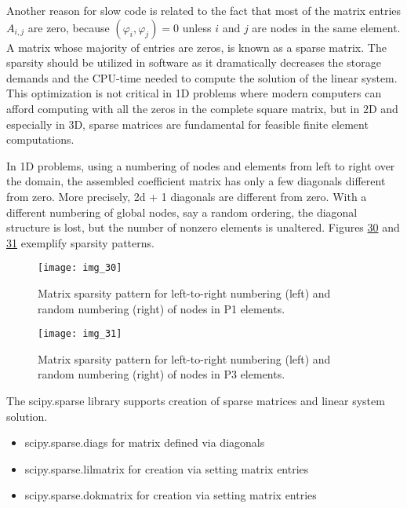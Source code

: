 \documentclass[../main.tex]{subfiles}
\begin{document}
	Another reason for slow code is related to the fact that most of the matrix entries $A_{i, j}$ are zero, because $\left(\varphi_{i}, \varphi_{j}\right)=0$ unless $i$ and $j$ are nodes in the same element. A matrix whose majority of entries are zeros, is known as a sparse matrix. The sparsity should be utilized in software as it dramatically decreases the storage demands and the CPU-time needed to compute the solution of the linear system. This optimization is not critical in 1D problems where modern computers can afford computing with all the zeros in the complete square matrix, but in $2 \mathrm{D}$ and especially in 3D, sparse matrices are fundamental for feasible finite element computations.
	
	In 1D problems, using a numbering of nodes and elements from left to right
	over the domain, the assembled coefficient matrix has only a few diagonals
	different from zero. More precisely, 2d + 1 diagonals are different from zero.
	With a different numbering of global nodes, say a random ordering, the diagonal
	structure is lost, but the number of nonzero elements is unaltered. Figures \hyperref[fig:img_30]{30}
	and \hyperref[fig:img_31]{31} exemplify sparsity patterns.
	\begin{figure}[H]
		\centering
		\texttt{[image: img\_30]}
		\caption{Matrix sparsity pattern for left-to-right numbering (left) and random
			numbering (right) of nodes in P1 elements.}
		\label{fig:img_30}
	\end{figure}
	\begin{figure}[H]
		\centering
		\texttt{[image: img\_31]}
		\caption{Matrix sparsity pattern for left-to-right numbering (left) and random
			numbering (right) of nodes in P3 elements.}
		\label{fig:img_31}
	\end{figure}
	
	The scipy.sparse library supports creation of sparse matrices and linear system solution.
	\begin{itemize}
		\item scipy.sparse.diags for matrix defined via diagonals
		\item scipy.sparse.lil\textunderscore matrix for creation via setting matrix entries
		\item scipy.sparse.dok\textunderscore matrix for creation via setting matrix entries
	\end{itemize}
\clearpage
\end{document}
